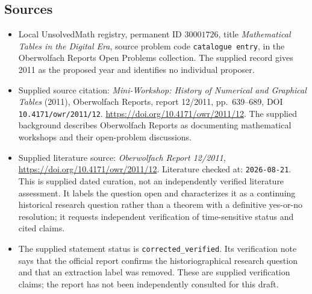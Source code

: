\documentclass[11pt]{article}
\begin{document}
\subsection{Sources}
\begin{itemize}
\item Local UnsolvedMath registry, permanent ID \(30001726\), title \emph{Mathematical Tables in the Digital Era}, source problem code \texttt{catalogue entry}, in the Oberwolfach Reports Open Problems collection. The supplied record gives 2011 as the proposed year and identifies no individual proposer.
\item Supplied source citation: \emph{Mini-Workshop: History of Numerical and Graphical Tables} (2011), Oberwolfach Reports, report 12/2011, pp.\ 639--689, DOI \texttt{10.4171/owr/2011/12}. \url{https://doi.org/10.4171/owr/2011/12}. The supplied background describes Oberwolfach Reports as documenting mathematical workshops and their open-problem discussions.
\item Supplied literature source: \emph{Oberwolfach Report 12/2011}, \url{https://doi.org/10.4171/owr/2011/12}. Literature checked at: \texttt{2026-08-21}. This is supplied dated curation, not an independently verified literature assessment. It labels the question open and characterizes it as a continuing historical research question rather than a theorem with a definitive yes-or-no resolution; it requests independent verification of time-sensitive status and cited claims.
\item The supplied statement status is \texttt{corrected\_verified}. Its verification note says that the official report confirms the historiographical research question and that an extraction label was removed. These are supplied verification claims; the report has not been independently consulted for this draft.
\end{itemize}
\end{document}
